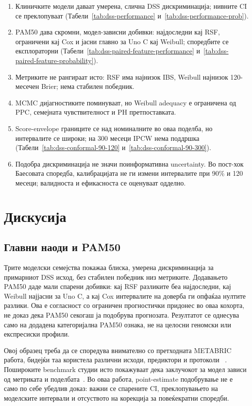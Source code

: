 \documentclass[12pt]{article}
\begin{document}
\begin{enumerate}
\item Клиничките модели даваат умерена, слична DSS дискриминација; нивните CI се преклопуваат (Табели~\ref{tab:dss-performance} и~\ref{tab:dss-performance-prob}).
\item PAM50 дава скромни, модел-зависни добивки: најдоследни кај RSF, ограничени кај Cox и јасни главно за Uno C кај Weibull; споредбите се експлораторни (Табели~\ref{tab:dss-paired-feature-performance} и~\ref{tab:dss-paired-feature-probability}).
\item Метриките не рангираат исто: RSF има најнизок IBS, Weibull најнизок 120-месечен Brier; нема стабилен победник.
\item MCMC дијагностиките поминуваат, но Weibull adequacy е ограничена од PPC, семејната чувствителност и PH претпоставката.
\item Score-envelope границите се над номиналните во оваа поделба, но интервалите се широки; на 300 месеци IPCW нема поддршка (Табели~\ref{tab:dss-conformal-90-120} и~\ref{tab:dss-conformal-90-300}).
\item Подобра дискриминација не значи поинформативна uncertainty. Во пост-хок Баесовата споредба, калибрацијата не ги измени интервалите при 90\% и 120 месеци; валидноста и ефикасноста се оценуваат одделно.
\end{enumerate}

\section{Дискусија}

\subsection{Главни наоди и PAM50}

Трите моделски семејства покажаа блиска, умерена дискриминација за примарниот
DSS исход, без стабилен победник низ метриките. Додавањето PAM50 даде мали
спарени добивки: кај RSF разликите беа најдоследни, кај Weibull најјасни за
Uno C, а кај Cox интервалите на доверба ги опфаќаа нултите разлики. Ова е
согласност со ограничен прогностички придонес во оваа кохорта, не доказ дека
PAM50 секогаш ја подобрува прогнозата. Резултатот се однесува само на додадена
категоријална PAM50 ознака, не на целосни геномски или експресиски профили.

Овој образец треба да се споредува внимателно со претходната METABRIC работа,
бидејќи таа користела различни исходи, предиктори и протоколи
~\cite{neapolitan2015}. Пошироките benchmark студии исто покажуваат дека
заклучокот за модел зависи од метриката и поделбата~\cite{wissel2025}. Во оваа
работа, point-estimate подобрување не е само по себе убедлив доказ: важни се
спарените CI, преклопувањето на моделските интервали и отсуството на корекција
за повеќекратни споредби.
\end{document}
